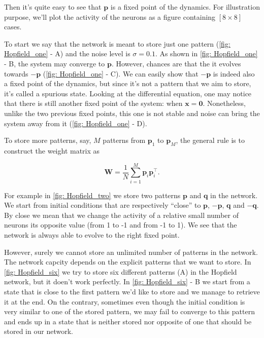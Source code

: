 \noindent
Then it's quite easy to see that $\mathbf{p}$ is a fixed point of the
dynamics. For illustration purpose, we'll plot the activity of the neurons
as a figure containing $[8 \times 8]$ cases.

To start we say that the network is meant to store just one pattern 
(\autoref{fig: Hopfield_one} - \textsf{A}) and the
noise level is $\sigma = 0.1$. As shown in \autoref{fig: Hopfield_one} -
\textsf{B}, the system may converge to $\mathbf{p}$. However, chances are 
that the it evolves towards $-\mathbf{p}$ 
(\autoref{fig: Hopfield_one} - \textsf{C}). We can easily show
that $-\mathbf{p}$ is indeed also a fixed point of the dynamics, but since
it's not a pattern that we aim to store, it's called a spurious state.
Looking at the differential equation, one may notice that there is still
another fixed point of the system: when $\mathbf{x} = \mathbf{0}$. 
Nonetheless, unlike the two previous fixed points, this one is not stable
and noise can bring the system away from it (\autoref{fig: Hopfield_one} -
\textsf{D}).

To store more patterns, say, $M$ patterns from $\mathbf{p}_1$ to 
$\mathbf{p}_M$, the general rule is to construct the weight matrix as

\[\mathbf{W} = \frac{1}{N} \sum_{i=1}^M \mathbf{p}_i\mathbf{p}_i^{\top}.\]

\noindent
For example in \autoref{fig: Hopfield_two} we store two patterns $\mathbf{p}$
and $\mathbf{q}$ in the network. We start from 
initial conditions that are respectively ``close'' to $\mathbf{p}$,
$-\mathbf{p}$, $\mathbf{q}$ and $-\mathbf{q}$. By close we mean that we change
the activity of a relative small number of neurons its opposite value 
(from 1 to -1 and from -1 to 1). We see that the network is always able
to evolve to the right fixed point.

However, surely we cannot store an unlimited number of patterns in the 
network. The network capcity depends on the explicit patterns that we want
to store. In \autoref{fig: Hopfield_six} we try to store six different 
patterns (\textsf{A}) in the Hopfield network, but it doen't work perfectly.
In \autoref{fig: Hopfield_six} - \textsf{B} we start from a state that is
close to the first pattern we'd like to store and we manage to retrieve it
at the end. On the contrary, sometimes even though the initial condition 
is very similar to one of the stored pattern, we may fail to converge to 
this pattern and ends up in a state that is neither stored nor opposite of 
one that should be stored in our network.

